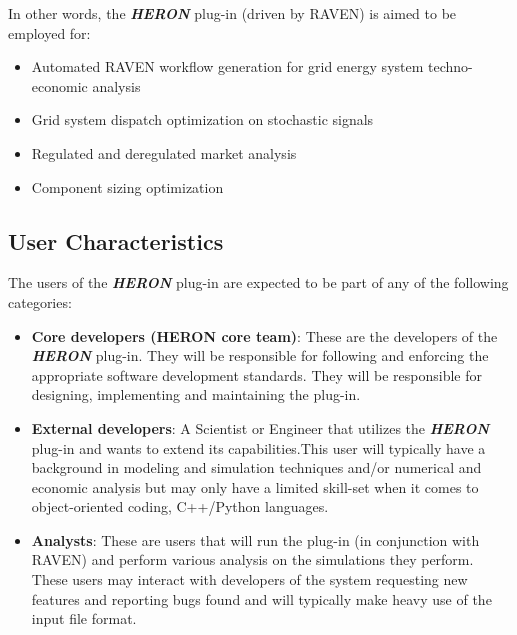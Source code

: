 In other words, the  \textbf{\textit{HERON}} plug-in (driven by RAVEN) is aimed to be employed for:
\begin{itemize}
  \item Automated RAVEN workflow generation for grid energy system techno-economic analysis
  \item Grid system dispatch optimization on stochastic signals
  \item Regulated and deregulated market analysis
  \item Component sizing optimization
\end{itemize}


\subsection{User Characteristics}

The users of the \textbf{\textit{HERON}} plug-in are expected to be part of any of the
following categories:
\begin{itemize}
  \item \textbf{Core developers (HERON core team)}: These are the developers of the \textbf{\textit{HERON}}  plug-in. They will be responsible for following
    and enforcing the appropriate software development standards. They will be responsible for designing, implementing and 
    maintaining the plug-in.
  \item \textbf{External developers}: A Scientist or Engineer that utilizes the \textbf{\textit{HERON}}  plug-in and wants to extend its 
  capabilities.This user will typically have a background in modeling and 
simulation techniques and/or numerical and economic analysis but may only have a limited skill-set when it comes to object-oriented 
coding, C++/Python languages.
  \item \textbf{Analysts}:  These are users that will run the plug-in (in conjunction with RAVEN) and perform various analysis on the 
  simulations they perform. These users may interact with developers of the system requesting new features and reporting bugs found 
  and will typically make heavy use of the input file format.
\end{itemize}
